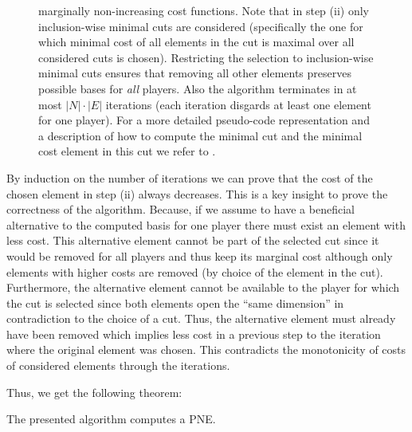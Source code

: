 \documentclass{scrartcl}
\theoremstyle{nonumberplain}
\begin{document}
\begin{figure}
{    marginally non-increasing cost functions. Note that in step (ii) only
    inclusion-wise minimal cuts are considered (specifically the one for which
    minimal cost of all elements in the cut is maximal over all considered cuts
    is chosen). Restricting the selection to inclusion-wise minimal cuts
    ensures that removing all other elements preserves possible bases for
    \emph{all} players. Also the algorithm terminates in at most $|N|\cdot|E|$
    iterations (each iteration disgards at least one element for one player).
    For a more detailed pseudo-code representation and a description of how to
    compute the minimal cut and the minimal cost element in this cut we refer
    to \cite[Algorithm 1 and 3.3 A Subroutine to Detect $C^{\ast}, e^{\ast}$
    and $i^{\ast}$]{main}.}
  \label{alg:main}
\end{figure}
By induction on the number of iterations we can prove that the cost of the
chosen element in step (ii) always decreases. This is a key insight to prove
the correctness of the algorithm. Because, if we assume to have a beneficial
alternative to the computed basis for one player there must exist an element
with less cost. This alternative element cannot be part of the selected cut
since it would be removed for all players and thus keep its marginal cost
although only elements with higher costs are removed (by choice of the element
in the cut). Furthermore, the alternative element cannot be available to the
player for which the cut is selected since both elements open the
\enquote{same dimension} in contradiction to the choice of a cut. Thus, the
alternative element must already have been removed which implies less
cost in a previous step to the iteration where the original element was chosen.
This contradicts the monotonicity of costs of considered elements through the
iterations. {Thus, we get the following theorem:
\begin{theo}
  The presented algorithm computes a PNE.
\end{theo}
}
\end{document}
